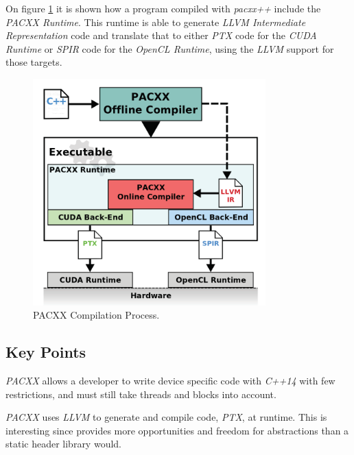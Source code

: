 On figure \ref{fig:pacxxCompilation} it is shown how a program compiled with \textit{pacxx++} include the \textit{PACXX Runtime}. This runtime is able to generate \textit{LLVM Intermediate Representation} code and translate that to either \textit{PTX} code for the \textit{CUDA Runtime} or \textit{SPIR} code for the \textit{OpenCL Runtime}, using the \textit{LLVM} support for those targets.
\begin{figure}[H]
\center
\includegraphics[width=0.8\textwidth]{chapters/relatedWorks/figures/pacxx_compilation_cool.png}
\caption{PACXX Compilation Process\cite{pacxxPaper2}.}
\label{fig:pacxxCompilation}
\end{figure}

\subsection{Key Points}
\textit{PACXX} allows a developer to write device specific code with \textit{C++14} with few restrictions, and must still take threads and blocks into account. 

\textit{PACXX} uses \textit{LLVM} to generate and compile code, \textit{PTX}, at runtime. This is interesting since provides more opportunities and freedom for abstractions than a static header library would.

